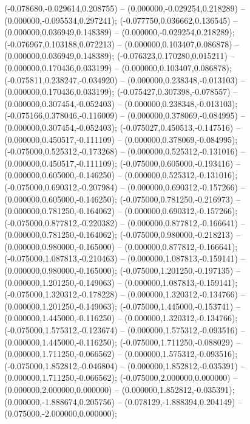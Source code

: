  (-0.078680,-0.029614,0.208755) -- (0.000000,-0.029254,0.218289) -- (0.000000,-0.095534,0.297241);
 (-0.077750,0.036662,0.136545) -- (0.000000,0.036949,0.148389) -- (0.000000,-0.029254,0.218289);
 (-0.076967,0.103188,0.072213) -- (0.000000,0.103407,0.086878) -- (0.000000,0.036949,0.148389);
 (-0.076323,0.170280,0.015211) -- (0.000000,0.170436,0.033199) -- (0.000000,0.103407,0.086878);
 (-0.075811,0.238247,-0.034920) -- (0.000000,0.238348,-0.013103) -- (0.000000,0.170436,0.033199);
 (-0.075427,0.307398,-0.078557) -- (0.000000,0.307454,-0.052403) -- (0.000000,0.238348,-0.013103);
 (-0.075166,0.378046,-0.116009) -- (0.000000,0.378069,-0.084995) -- (0.000000,0.307454,-0.052403);
 (-0.075027,0.450513,-0.147516) -- (0.000000,0.450517,-0.111109) -- (0.000000,0.378069,-0.084995);
 (-0.075000,0.525312,-0.173268) -- (0.000000,0.525312,-0.131016) -- (0.000000,0.450517,-0.111109);
 (-0.075000,0.605000,-0.193416) -- (0.000000,0.605000,-0.146250) -- (0.000000,0.525312,-0.131016);
 (-0.075000,0.690312,-0.207984) -- (0.000000,0.690312,-0.157266) -- (0.000000,0.605000,-0.146250);
 (-0.075000,0.781250,-0.216973) -- (0.000000,0.781250,-0.164062) -- (0.000000,0.690312,-0.157266);
 (-0.075000,0.877812,-0.220382) -- (0.000000,0.877812,-0.166641) -- (0.000000,0.781250,-0.164062);
 (-0.075000,0.980000,-0.218213) -- (0.000000,0.980000,-0.165000) -- (0.000000,0.877812,-0.166641);
 (-0.075000,1.087813,-0.210463) -- (0.000000,1.087813,-0.159141) -- (0.000000,0.980000,-0.165000);
 (-0.075000,1.201250,-0.197135) -- (0.000000,1.201250,-0.149063) -- (0.000000,1.087813,-0.159141);
 (-0.075000,1.320312,-0.178228) -- (0.000000,1.320312,-0.134766) -- (0.000000,1.201250,-0.149063);
 (-0.075000,1.445000,-0.153741) -- (0.000000,1.445000,-0.116250) -- (0.000000,1.320312,-0.134766);
 (-0.075000,1.575312,-0.123674) -- (0.000000,1.575312,-0.093516) -- (0.000000,1.445000,-0.116250);
 (-0.075000,1.711250,-0.088029) -- (0.000000,1.711250,-0.066562) -- (0.000000,1.575312,-0.093516);
 (-0.075000,1.852812,-0.046804) -- (0.000000,1.852812,-0.035391) -- (0.000000,1.711250,-0.066562);
 (-0.075000,2.000000,0.000000) -- (0.000000,2.000000,0.000000) -- (0.000000,1.852812,-0.035391);
 (0.000000,-1.888674,0.205756) -- (0.078129,-1.888394,0.204149) -- (0.075000,-2.000000,0.000000);

